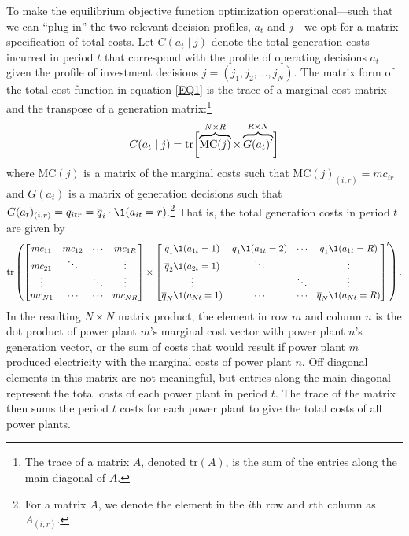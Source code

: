 To make the equilibrium objective function optimization operational---such that we can ``plug in'' the two relevant decision profiles, $a_t$ and $j$---we opt for a matrix specification of total costs. Let $C(a_t \mid j)$ denote the total generation costs incurred in period $t$ that correspond with the profile of operating decisions $a_t$ given the profile of investment decisions $j = (j_1, j_2, \ldots, j_N)$. The matrix form of the total cost function in equation \eqref{EQ1} is the trace of a marginal cost matrix and the transpose of a generation matrix:\footnote{The trace of a matrix $A$, denoted $\text{tr}(A)$, is the sum of the entries along the main diagonal of $A$.} 
\begin{equation}\label{C_matrix}
    C (a_t \mid j) = \text{tr}\biggl[ \overbrace{\text{MC}(j)}^{N \times R} \times \overbrace{G(a_t)'}^{R \times N} \biggr] \\
\end{equation}
where $\text{MC}(j)$ is a matrix of the marginal costs such that $\text{MC}(j)_{(i,r)} = mc_{ir}$ and $G(a_t)$ is a matrix of generation decisions such that $G(a_t)_{(i,r)} = q_{itr} = \overline{q}_i \cdot \1(a_{it} = r)$.\footnote{For a matrix $A$, we denote the element in the $i$th row and $r$th column as $A_{(i,r)}$.} That is, the total generation costs in period $t$ are given by
\[
    \text{tr}\left( 
        \begin{bmatrix}
            mc_{11} & mc_{12} & \cdots & mc_{1R} \\
            mc_{21} & \ddots & & \vdots \\
            \vdots & & \ddots & \vdots \\
            mc_{N1} & \cdots & \cdots  & mc_{NR} 
        \end{bmatrix} \times \begin{bmatrix}
            \overline{q}_1 \1(a_{1t} = 1) & \overline{q}_1 \1(a_{1t} = 2) & \cdots & \overline{q}_1 \1(a_{1t} = R) \\
            \overline{q}_2 \1(a_{2t} = 1) & \ddots & & \vdots \\
            \vdots & & \ddots & \vdots \\
            \overline{q}_N  \1(a_{Nt} = 1) & \cdots & \cdots  & \overline{q}_N  \1(a_{Nt} = R) 
        \end{bmatrix}'
    \right).
\]
In the resulting $N \times N$ matrix product, the element in row $m$ and column $n$ is the dot product of power plant $m$'s marginal cost vector with power plant $n$'s generation vector, or the sum of costs that would result if power plant $m$ produced electricity with the marginal costs of power plant $n$. Off diagonal elements in this matrix are not meaningful, but entries along the main diagonal represent the total costs of each power plant in period $t$. The trace of the matrix then sums the period $t$ costs for each power plant to give the total costs of all power plants.

